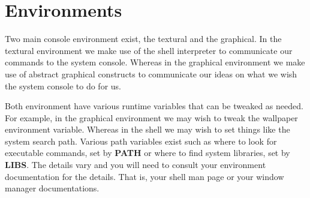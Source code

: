 
\section{Environments} %
\label{sec:environment}

Two main console environment exist, the textural and the
graphical. In the textural environment we make use of the
shell interpreter to communicate our commands to the
system console. Whereas in the graphical environment we
make use of abstract graphical constructs to communicate
our ideas on what we wish the system console to do for us.

Both environment have various runtime variables that can
be tweaked as needed. For example, in the graphical
environment we may wish to tweak the wallpaper environment
variable. Whereas in the shell we may wish to set things
like the system search path. Various path variables exist
such as where to look for executable commands, set by
\textbf{PATH} or where to find system libraries, set by
\textbf{LIBS}. The details vary and you will need to
consult your environment documentation for the details.
That is, your shell man page or your window manager
documentations.



